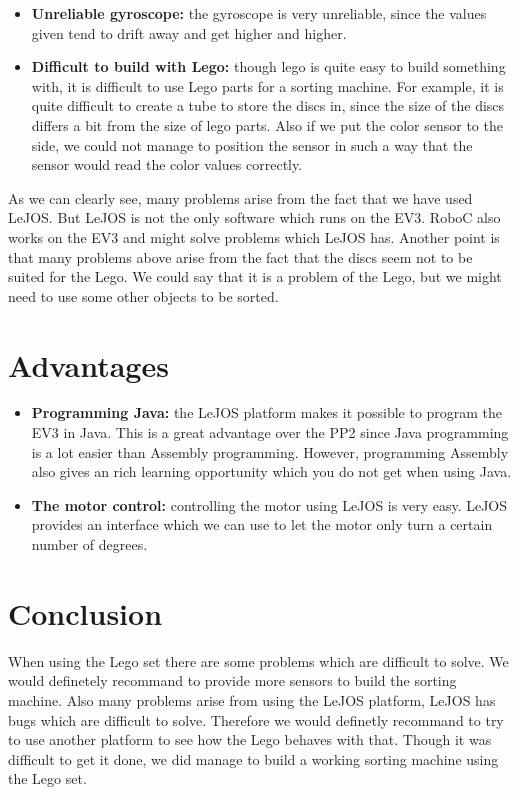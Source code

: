 \documentclass[a4paper,oneside,11pt]{article}
\begin{document}
\begin{itemize}
    \item \textbf{Unreliable gyroscope: } the gyroscope is very unreliable, since the values given tend to drift away and get higher and higher.
    \item \textbf{Difficult to build with Lego: } though lego is quite easy to build something with, it is difficult to use Lego parts for a sorting machine. For example, it is quite difficult to create a tube to store the discs in, since the size of the discs differs a bit from the size of lego parts. Also if we put the color sensor to the side, we could not manage to position the sensor in such a way that the sensor would read the color values correctly.
\end{itemize}

As we can clearly see, many problems arise from the fact that we have used LeJOS. But LeJOS is not the only software which runs on the EV3. RoboC also works on the EV3 and might solve problems which LeJOS has. Another point is that many problems above arise from the fact that the discs seem not to be suited for the Lego. We could say that it is a problem of the Lego, but we might need to use some other objects to be sorted.

\section{Advantages}
\begin{itemize}
    \item \textbf{Programming Java:} the LeJOS platform makes it possible to program the EV3 in Java. This is a great advantage over the PP2 since Java programming is a lot easier than Assembly programming. However, programming Assembly also gives an rich learning opportunity which you do not get when using Java.
    \item \textbf{The motor control:} controlling the motor using LeJOS is very easy. LeJOS provides an interface which we can use to let the motor only turn a certain number of degrees.
\end{itemize}

\section{Conclusion}
When using the Lego set there are some problems which are difficult to solve. We would definetely recommand to provide more sensors to build the sorting machine. Also many problems arise from using the LeJOS platform, LeJOS has bugs which are difficult to solve. Therefore we would definetly recommand to try to use another platform to see how the Lego behaves with that. Though it was difficult to get it done, we did manage to build a working sorting machine using the Lego set.
\end{document}
